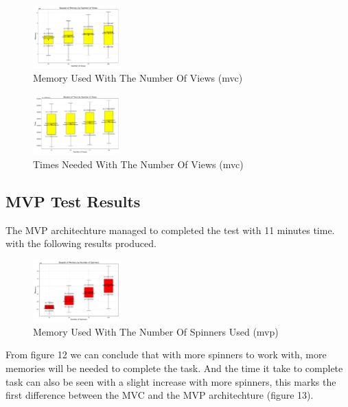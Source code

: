 \documentclass[conference]{IEEEtran}
\begin{document}
\begin{figure}
    [h]
    \centering
    \includegraphics[width = 0.3\textwidth]{Image/mvc_plot_view_total_memory.pdf}
    \caption{Memory Used With The Number Of Views (mvc)}
    \label{fig:enter-label}
\end{figure}

\begin{figure}
    [h]
    \centering
    \includegraphics[width = 0.3\textwidth]{Image/mvc_plot_view_total_time.pdf}
    \caption{Times Needed With The Number Of Views (mvc)}
    \label{fig:enter-label}
\end{figure}

\subsection{MVP Test Results}

The MVP architechture managed to completed the test with 11 minutes time. with the following results produced.

\begin{figure}
    [h]
    \centering
    \includegraphics[width = 0.3\textwidth]{Image/mvp_plot_spin_total_memory.pdf}
    \caption{Memory Used With The Number Of Spinners Used (mvp)}
    \label{fig:enter-label}
\end{figure}

From figure 12 we can conclude that with more spinners to work with, more memories will be needed to complete the task. And the time it take to complete task can also be seen with a slight increase with more spinners, this marks the first difference between the MVC and the MVP architechture (figure 13).
\end{document}
